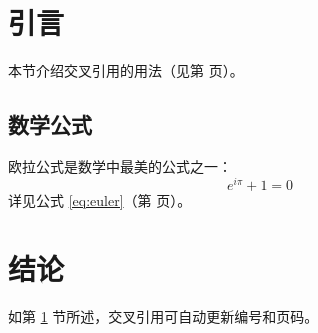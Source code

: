 \documentclass[UTF8]{ctexart}
\begin{document}
\pagestyle{plain}%
\section{引言}
\label{sec:intro} %
本节介绍交叉引用的用法（见第 \pageref{sec:intro} 页）。

\subsection{数学公式}%
欧拉公式是数学中最美的公式之一：
\begin{equation}
e^{i\pi} + 1 = 0
\label{eq:euler} %
\end{equation}
详见公式 \eqref{eq:euler}（第 \pageref{eq:euler} 页）。
\clearpage
\section{结论}
如第 \ref{sec:intro} 节所述，交叉引用可自动更新编号和页码。
\newsavebox{\Mysquare}
\sbox{\Mysquare}{\fboxrule=1pt\framebox{\rule{7mm}{0pt}\rule{0pt}{7mm}}}
\usebox{\Mysquare}
\usebox{\Mysquare}
\end{document}
